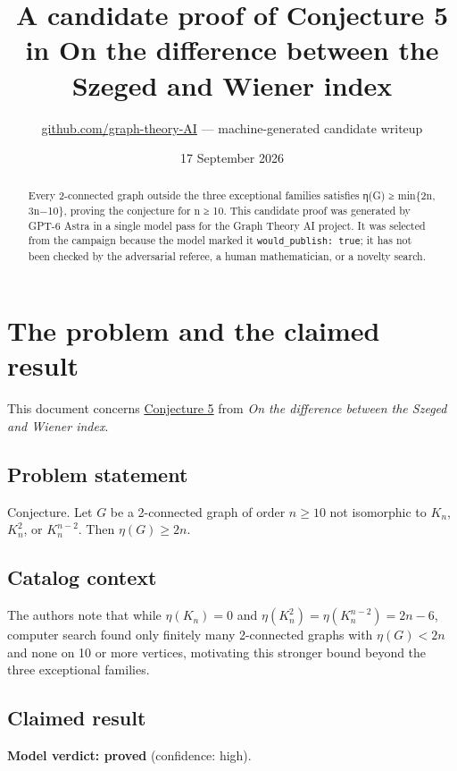 \documentclass[
  11pt,
  a4paper,
]{article}
\title{A candidate proof of Conjecture 5 in On the difference between
the Szeged and Wiener index}
\author{\href{https://github.com/graph-theory-AI}{github.com/graph-theory-AI}
--- machine-generated candidate writeup}
\date{17 September 2026}
\newcounter{none} %
\begin{document}
\maketitle
\begin{abstract}
Every 2-connected graph outside the three exceptional families satisfies
η(G) ≥ min\{2n, 3n−10\}, proving the conjecture for n ≥ 10. This
candidate proof was generated by GPT-6 Astra in a single model pass for
the Graph Theory AI project. It was selected from the campaign because
the model marked it \texttt{would\_publish:\ true}; it has not been
checked by the adversarial referee, a human mathematician, or a novelty
search.
\end{abstract}

\section{The problem and the claimed
result}\label{the-problem-and-the-claimed-result}

This document concerns
\href{https://graph-theory-ai.github.io/graph-conjectures/arxiv/1602.05184__00/}{Conjecture
5} from \emph{On the difference between the Szeged and Wiener index}.

\subsection{Problem statement}\label{problem-statement}

Conjecture. Let \(G\) be a 2-connected graph of order \(n \geq 10\) not
isomorphic to \(K_n\), \(K^2_n\), or \(K^{n-2}_n\). Then
\(\eta(G) \geq 2n\).

\subsection{Catalog context}\label{catalog-context}

The authors note that while \(\eta(K_n)=0\) and
\(\eta(K^2_n)=\eta(K^{n-2}_n)=2n-6\), computer search found only
finitely many 2-connected graphs with \(\eta(G)<2n\) and none on 10 or
more vertices, motivating this stronger bound beyond the three
exceptional families.

\subsection{Claimed result}\label{claimed-result}

\textbf{Model verdict: proved} (confidence: high).
\end{document}
